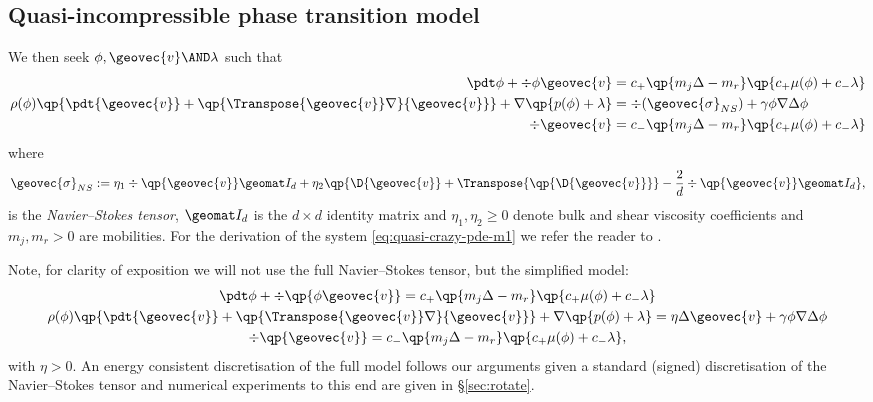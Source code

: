 \documentclass[final]{amsart}
\numberwithin{equation}{section}
\begin{document}
\subsection{Quasi-incompressible phase transition model}
We then seek $\phi, {\geovec{v}} \AND \lambda$ such that
\begin{equation}
  \label{eq:quasi-crazy-pde-m1}
  \begin{split}
  \pdt \phi + \div{\phi{\geovec{v}}} 
  &=
  c_+ \qp{m_j \Delta - m_r}\qp{c_+ \mu(\phi) + c_- \lambda} 
  \\
  \rho(\phi)
  \qp{
    \pdt {{\geovec{v}}}
    +
    \qp{\Transpose{{\geovec{v}}} \nabla}{\geovec{v}}
  }
  +
  \nabla \qp{p(\phi)+\lambda}
  &= 
   \div( {\geovec{\sigma}}_{NS})
  +
  \gamma \phi \nabla\Delta \phi 
  \\
  \div{{\geovec{v}}} 
  &=
  c_-
  \qp{m_j \Delta - m_r}\qp{c_+ \mu(\phi) + c_- \lambda} 
  \end{split}
\end{equation}
where
\begin{equation}
  {\geovec{\sigma}}_{NS} := \eta_1 \div\qp{{\geovec{v}}} \geomat I_d + \eta_2 \qp{\D {\geovec{v}} + \Transpose{\qp{\D {\geovec{v}}}} -\frac{2}{d}\div\qp{{\geovec{v}}} \geomat I_d },
\end{equation}
is the \emph{Navier--Stokes tensor}, $\geomat I_d$ is the $d\times d$
identity matrix and $\eta_1, \eta_2 \geq 0$
denote bulk and shear viscosity coefficients and $m_j,m_r>0$ are
mobilities. For the derivation of the system
\eqref{eq:quasi-crazy-pde-m1} we refer the reader to \cite{ADGK}.

Note, for clarity of exposition we will not use the full
Navier--Stokes tensor, but the simplified model:
\begin{gather}
  \label{eq:quasi-crazy-pde-1}
  \pdt \phi + \div\qp{\phi{\geovec{v}}} 
  =
  c_+ \qp{m_j \Delta - m_r}\qp{c_+ \mu(\phi) + c_- \lambda} 
  \\
  \label{eq:quasi-crazy-pde-2}
  \rho(\phi)
  \qp{
    \pdt {{\geovec{v}}}
    +
    \qp{\Transpose{{\geovec{v}}} \nabla}{\geovec{v}}
  }
  +
  \nabla \qp{p(\phi)+\lambda}
  = 
  \eta \Delta {\geovec{v}}
  +
  \gamma \phi \nabla\Delta \phi
  \\
  \label{eq:quasi-crazy-pde-3}
  \div\qp{{\geovec{v}}} 
  =
  c_-
  \qp{m_j \Delta - m_r}\qp{c_+ \mu(\phi) + c_- \lambda} ,
\end{gather}
with $\eta >0$.
An energy consistent discretisation of the full model follows our
arguments given a standard (signed) discretisation of the
Navier--Stokes tensor and numerical experiments to this end are
  given in \S\ref{sec:rotate}.
\end{document}
